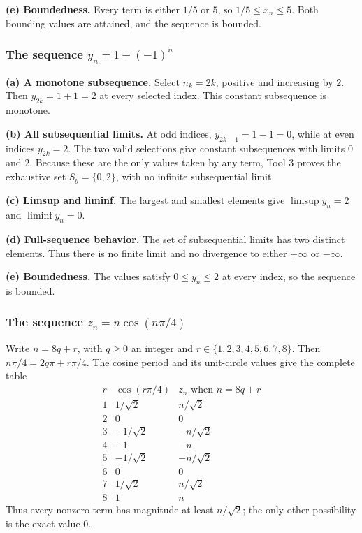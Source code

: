 \textbf{(e) Boundedness.}
Every term is either $1/5$ or $5$, so
$1/5\leq x_n\leq5$. Both bounding values are attained,
and the sequence is bounded.

\subsubsection*{The sequence $y_n=1+(-1)^n$}

\textbf{(a) A monotone subsequence.}
Select $n_k=2k$, positive and increasing by $2$.
Then $y_{2k}=1+1=2$ at every selected index.
This constant subsequence is monotone.

\textbf{(b) All subsequential limits.}
At odd indices, $y_{2k-1}=1-1=0$, while at even indices
$y_{2k}=2$. The two valid selections give constant subsequences
with limits $0$ and $2$. Because these are the only values
taken by any term, Tool 3 proves the exhaustive set
$S_y=\{0,2\}$, with no infinite subsequential limit.

\textbf{(c) Limsup and liminf.}
The largest and smallest elements give
$\limsup y_n=2$ and $\liminf y_n=0$.

\textbf{(d) Full-sequence behavior.}
The set of subsequential limits has two distinct elements.
Thus there is no finite limit and no divergence to either
$+\infty$ or $-\infty$.

\textbf{(e) Boundedness.}
The values satisfy $0\leq y_n\leq2$ at every index,
so the sequence is bounded.

\subsubsection*{The sequence $z_n=n\cos(n\pi/4)$}

Write $n=8q+r$, with $q\geq0$ an integer and
$r\in\{1,2,3,4,5,6,7,8\}$. Then
$n\pi/4=2q\pi+r\pi/4$. The cosine period and its
unit-circle values give the complete table
\[
\begin{array}{c|c|c}
 r&\cos(r\pi/4)&z_n\text{ when }n=8q+r\\ \hline
 1&1/\sqrt2&n/\sqrt2\\
 2&0&0\\
 3&-1/\sqrt2&-n/\sqrt2\\
 4&-1&-n\\
 5&-1/\sqrt2&-n/\sqrt2\\
 6&0&0\\
 7&1/\sqrt2&n/\sqrt2\\
 8&1&n
\end{array}
\]
Thus every nonzero term has magnitude at least $n/\sqrt2$;
the only other possibility is the exact value $0$.

